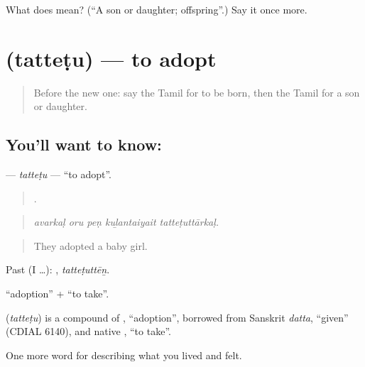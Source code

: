 \begin{tcolorbox}[breakable,colback=teal!4,colframe=teal!35!black,title={Before you move on}]
What does  mean? (\textquotedblleft{}A son or daughter; offspring\textquotedblright{}.) Say it once more.
\end{tcolorbox}
\section[\texorpdfstring{\ta{தத்தெடு} (tatteṭu)}{தத்தெடு (tatteṭu)}]{ (tatteṭu) — to adopt}

\label{lesson:TA-C496-tattetu}



\begin{quote}
Before the new one: say the Tamil for to be born, then the Tamil for a son or daughter.
\end{quote}

\subsection*{You'll want to know: }
\textbf{} — \emph{tatteṭu} — \textquotedblleft{}to adopt\textquotedblright{}.

\begin{quote}
    .
\end{quote}

\begin{quote}
\emph{avarkaḷ oru peṇ kuḻantaiyait tatteṭuttārkaḷ.}
\end{quote}

\begin{quote}
They adopted a baby girl.
\end{quote}

Past (I …): , \emph{tatteṭuttēṉ}.

 \textquotedblleft{}adoption\textquotedblright{} +  \textquotedblleft{}to take\textquotedblright{}.

\begin{cousinweb}
\textbf{} (\emph{tatteṭu}) is a compound of , \textquotedblleft{}adoption\textquotedblright{}, borrowed from Sanskrit \emph{datta}, \textquotedblleft{}given\textquotedblright{} (CDIAL 6140), and native , \textquotedblleft{}to take\textquotedblright{}.
\end{cousinweb}

\begin{grammarlens}[title={What you've built}]
One more word for describing what you lived and felt.
\end{grammarlens}


